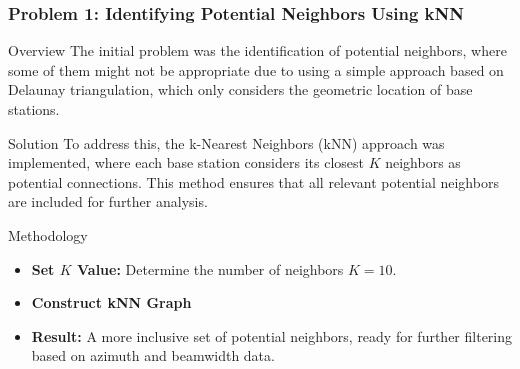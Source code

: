 \begin{frame}
    \frametitle{Problem 1: Identifying Potential Neighbors Using kNN}

    \begin{block}{Overview}
        The initial problem was the identification of potential neighbors, where some of them might not be appropriate due to using a simple approach based on Delaunay triangulation, which only considers the geometric location of base stations.
    \end{block}

    \begin{block}{Solution}
        To address this, the k-Nearest Neighbors (kNN) approach was implemented, where each base station considers its closest \(K\) neighbors as potential connections. This method ensures that all relevant potential neighbors are included for further analysis.
    \end{block}

    \begin{block}{Methodology}
        \begin{itemize}
            \item \textbf{Set \(K\) Value:} Determine the number of neighbors \(K = 10\).
            \item \textbf{Construct kNN Graph}
            \item \textbf{Result:} A more inclusive set of potential neighbors, ready for further filtering based on azimuth and beamwidth data.
        \end{itemize}
    \end{block}
\end{frame}



